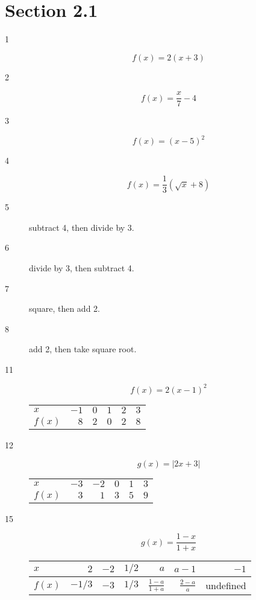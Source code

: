 \documentclass{exam}
\begin{document}
  \section{Section 2.1}
  \begin{description}
    \item[1]
      \[
        f(x) = 2(x + 3)
      \]

    \item[2]
      \[
        f(x) = \frac{x}{7} - 4
      \]

    \item[3]
      \[
        f(x) = (x - 5)^2
      \]

    \item[4]
      \[
        f(x) = \frac{1}{3} (\sqrt{x} + 8)
      \]

    \item[5] subtract 4, then divide by 3.

    \item[6] divide by 3, then subtract 4.

    \item[7] square, then add 2.

    \item[8] add 2, then take square root.

    \item[11]
      \[
        f(x) = 2(x - 1)^2
      \]
      \begin{tabular}{lrrrrr}
        \toprule
        $x$    & $-1$ & $0$ & $1$ & $2$ & $3$ \\
        $f(x)$ & $8$  & $2$ & $0$ & $2$ & $8$ \\
        \bottomrule
      \end{tabular}

    \item[12]
      \[
        g(x) = | 2x + 3 |
      \]
      \begin{tabular}{lrrrrr}
        \toprule
        $x$    & $-3$ & $-2$ & $0$ & $1$ & $3$ \\ 
        $f(x)$ &  $3$ &  $1$ & $3$ & $5$ & $9$ \\ 
        \bottomrule
      \end{tabular}

    \item[15]
      \[
        g(x) = \frac{1 - x}{1 + x}
      \]

      \begin{tabular}{lrrrrrr}
        \toprule
        $x$      & $2$    & $-2$ & $1/2$ & $a$                   & $a - 1$           & $-1$ \\
        \midrule
        $f(x)$   & $-1/3$ & $-3$ & $1/3$ & $\frac{1 - a}{1 + a}$ & $\frac{2 - a}{a}$ & undefined \\
        \bottomrule
      \end{tabular}


\end{description}
\end{document}
